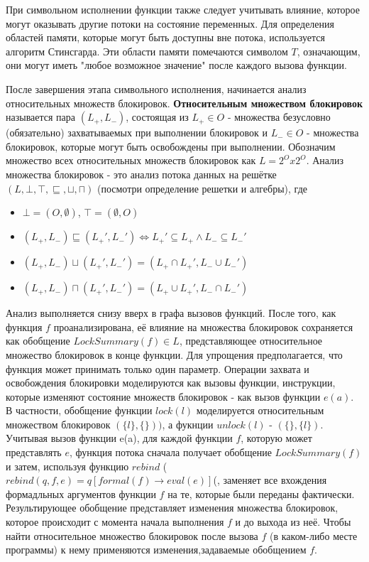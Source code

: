 При символьном исполнении функции также следует учитывать влияние, которое могут оказывать другие потоки на состояние переменных. Для определения областей памяти, которые могут быть доступны вне потока, используется алгоритм Стинсгарда. Эти области памяти помечаются символом $T$, означающим, они могут иметь "любое возможное значение" после каждого вызова функции.

После завершения этапа символьного исполнения, начинается анализ относительных множеств блокировок. \textbf{Относительным множеством блокировок} называется пара $(L_{+}, L_{-})$, состоящая из $L_{+} \in O$ - множества безусловно (обязательно) захватываемых при выполнении блокировок и $L_{-} \in O$ - множества блокировок, которые могут быть освобождены при выполнении. Обозначим множество всех относительных множеств блокировок как $L = 2^{O} x 2^{O}$. Анализ множества блокировок - это анализ потока данных на решётке $(L, \bot, \top, \sqsubseteq, \sqcup, \sqcap)$ (посмотри определение решетки  и алгебры), где
\begin{itemize}
\item $\bot = (O, \emptyset)$, $\top = (\emptyset, O)$
\item $(L_{+}, L_{-}) \sqsubseteq (L_{+}', L_{-}') \Longleftrightarrow L_{+}' \subseteq L_{+} \wedge L_{-} \subseteq L_{-}'$
\item $(L_{+}, L_{-}) \sqcup (L_{+}', L_{-}') = (L_{+} \cap L_{+}', L_{-} \cup L_{-}')$
\item $(L_{+}, L_{-}) \sqcap (L_{+}', L_{-}') = (L_{+} \cup L_{+}', L_{-} \cap L_{-}')$
\end{itemize}

Анализ выполняется снизу вверх в графа вызовов функций. После того, как функция $f$ проанализирована, её влияние на множества блокировок сохраняется как обобщение $LockSummary(f) \in L$, представляющее относительное множество блокировок в конце функции. Для упрощения предполагается, что функция может принимать только один параметр. Операции захвата и освобождения блокировки моделируются как вызовы функции, инструкции, которые изменяют состояние множеств блокировок - как вызов функции $e(a)$. В частности, обобщение функции $lock(l)$ моделируется относительным множеством блокировок $(\{l\}, \{\}))$, а фукнции $unlock(l)$ - $(\{\}, \{l\})$. Учитывая вызов функции e(a), для каждой функции $f$, которую может представлять $e$, функция потока сначала получает обобщение $LockSummary(f)$и затем, используя функцию $rebind$ ($rebind(q, f, e) = q[formal(f ) → eval(e)]$(, заменяет все вхождения формадльных аргументов функции $f$ на те, которые были переданы фактически. Результирующее обобщение представляет изменения множества блокировок, которое происходит с момента начала выполнения $f$ и до выхода из неё. Чтобы найти относительное множество блокировок после вызова $f$ (в каком-либо месте программы) к нему применяются изменения,задаваемые обобщением $f$.

